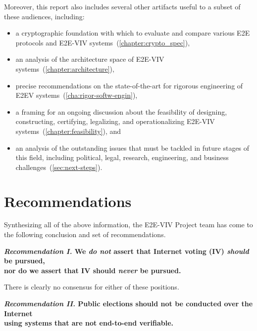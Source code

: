 Moreover, this report also includes several other artifacts useful to
a subset of these audiences, including:
\begin{itemize}
\item a cryptographic foundation with which to evaluate and compare
  various E2E protocols and E2E-VIV
  systems~(\autoref{chapter:crypto_spec}),
\item an analysis of the architecture space of E2E-VIV
  systems~(\autoref{chapter:architecture}),
\item precise recommendations on the state-of-the-art for rigorous
  engineering of E2EV systems~(\autoref{cha:rigor-softw-engin}),
\item a framing for an ongoing discussion about the feasibility of
  designing, constructing, certifying, legalizing, and operationalizing
  E2E-VIV systems~(\autoref{chapter:feasibility}), and
\item an analysis of the outstanding issues that must be tackled in
  future stages of this field, including political, legal, research,
  engineering, and business challenges~(\autoref{sec:next-steps}).
\end{itemize}

\section{Recommendations}

Synthesizing all of the above information, the E2E-VIV Project team has
come to the following conclusion and set of
recommendations. 

\begin{center}
  \textbf{\emph{Recommendation I.} We \emph{do not} assert that
    Internet voting (IV) \emph{should} be pursued,\\
    nor do we assert that IV should \emph{never} be pursued.}
\end{center}

There is clearly no consensus for either of these positions.

\begin{center}
  \textbf{\emph{Recommendation II.} Public elections should not be
    conducted over the Internet\\
    using systems that are not end-to-end verifiable.}
\end{center}

